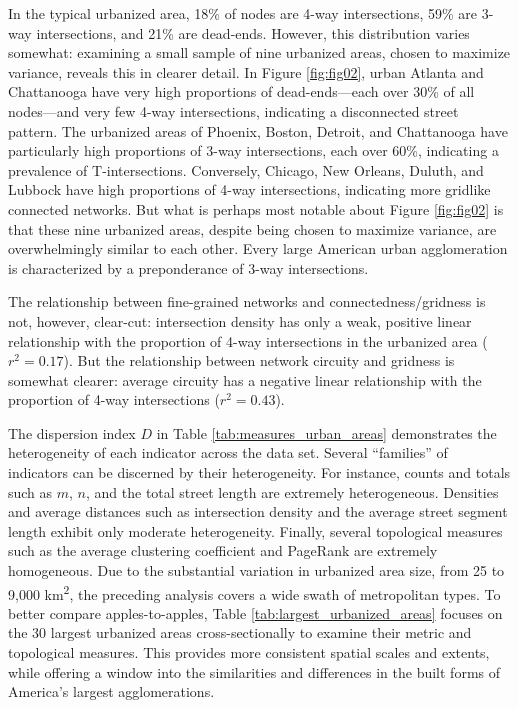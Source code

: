 \documentclass[11pt]{article}
\begin{document}
\begin{multicols}{2}
In the typical urbanized area, 18\% of nodes are 4-way intersections, 59\% are 3-way intersections, and 21\% are dead-ends. However, this distribution varies somewhat: examining a small sample of nine urbanized areas, chosen to maximize variance, reveals this in clearer detail. In Figure \ref{fig:fig02}, urban Atlanta and Chattanooga have very high proportions of dead-ends---each over 30\% of all nodes---and very few 4-way intersections, indicating a disconnected street pattern. The urbanized areas of Phoenix, Boston, Detroit, and Chattanooga have particularly high proportions of 3-way intersections, each over 60\%, indicating a prevalence of T-intersections. Conversely, Chicago, New Orleans, Duluth, and Lubbock have high proportions of 4-way intersections, indicating more gridlike connected networks. But what is perhaps most notable about Figure \ref{fig:fig02} is that these nine urbanized areas, despite being chosen to maximize variance, are overwhelmingly similar to each other. Every large American urban agglomeration is characterized by a preponderance of 3-way intersections.

The relationship between fine-grained networks and connectedness/gridness is not, however, clear-cut: intersection density has only a weak, positive linear relationship with the proportion of 4-way intersections in the urbanized area ($r^{2}=0.17$). But the relationship between network circuity and gridness is somewhat clearer: average circuity has a negative linear relationship with the proportion of 4-way intersections ($r^{2}=0.43$).

The dispersion index $D$ in Table \ref{tab:measures_urban_areas} demonstrates the heterogeneity of each indicator across the data set. Several \enquote{families} of indicators can be discerned by their heterogeneity. For instance, counts and totals such as $m$, $n$, and the total street length are extremely heterogeneous. Densities and average distances such as intersection density and the average street segment length exhibit only moderate heterogeneity. Finally, several topological measures such as the average clustering coefficient and PageRank are extremely homogeneous. Due to the substantial variation in urbanized area size, from 25 to 9,000 km\textsuperscript{2}, the preceding analysis covers a wide swath of metropolitan types. To better compare apples-to-apples, Table \ref{tab:largest_urbanized_areas} focuses on the 30 largest urbanized areas cross-sectionally to examine their metric and topological measures. This provides more consistent spatial scales and extents, while offering a window into the similarities and differences in the built forms of America's largest agglomerations.


\end{multicols}
\end{document}
